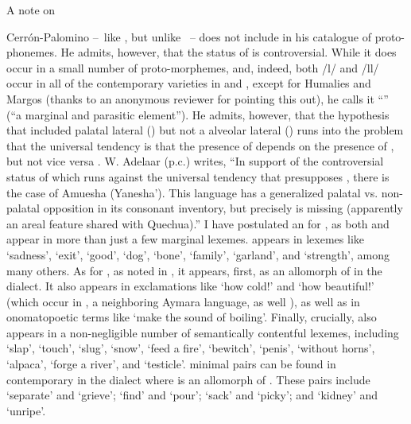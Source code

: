 A note on  {Cerrón-Palomino --~like \citep{torero1964dialectos}, but unlike \citet{Parker69}~-- does not include  in his catalogue of proto-phonemes. He admits, however, that the status of  is controversial. While it does occur in a small number of proto-morphemes, and, indeed, both /l/ and /ll/ occur in all of the \QI{} contemporary varieties in  and , except for Humalies and Margos (thanks to an anonymous reviewer for pointing this out), he calls it “” (“a marginal and parasitic element”). He admits, however, that the hypothesis that \PQ{} included palatal lateral () but not a alveolar lateral () runs into the problem that the universal tendency is that the presence of  depends on the presence of , but not vice versa \citet[123]{CerroP87}. W. Adelaar (p.c.) writes, “In support of the controversial status of  which runs against the universal tendency that  presupposes , there is the case of Amuesha (Yanesha’). This language has a generalized palatal vs. non-palatal opposition in its consonant inventory, but precisely  is missing (apparently an areal feature shared with Quechua).” I have postulated an  for \SYQ, as both \textipa{[λ]} and \textipa{[l]} appear in more than just a few marginal lexemes. \textipa{[λ]} appears in \SYQ{} lexemes like  ‘sadness’,  ‘exit’,  ‘good’,  ‘dog’,  ‘bone’,  ‘family’,  ‘garland’, and  ‘strength’, among many others. As for \textipa{[l]}, as noted in , it appears, first, as an allomorph of  in the \CH{} dialect. It also appears in exclamations like  ‘how cold!’ and  ‘how beautiful!’ (which occur in , a neighboring Aymara language, as well \citealt{Castro95}), as well as in onomatopoetic terms like  ‘make the sound of boiling’. Finally, crucially, \textipa{[l]} also appears in a non-negligible number of semantically contentful lexemes, including  ‘slap’,  ‘touch’,  ‘slug’,  ‘snow’,  ‘feed a fire’,  ‘bewitch’,  ‘penis’,  ‘without horns’,  ‘alpaca’,  ‘forge a river’, and  ‘testicle’. \textipa{[l]/[λ]} minimal pairs can be found in contemporary \SYQ{} in the \CH{} dialect where \textipa{[l]} is an allomorph of . These pairs include  ‘separate’ and  ‘grieve’;  ‘find’ and  ‘pour’;  ‘sack’ and  ‘picky’; and  ‘kidney’ and  ‘unripe’.

}
